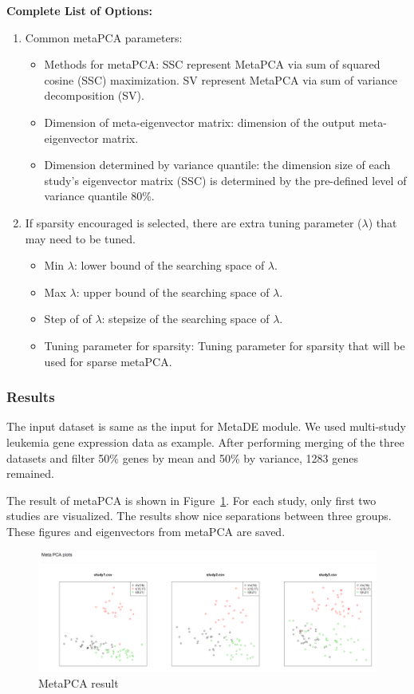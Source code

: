 \textbf{Complete List of Options:} 
\begin{enumerate}
\item Common metaPCA parameters: 

\begin{itemize}
\item Methods for metaPCA:
SSC represent MetaPCA via sum of squared cosine (SSC) maximization.
SV represent MetaPCA via sum of variance decomposition (SV).
\item Dimension of meta-eigenvector matrix: dimension of the output meta-eigenvector matrix.
\item Dimension determined by variance quantile:
the dimension size of each study's eigenvector matrix (SSC) is determined  by the pre-defined level of variance quantile 80\%.
\end{itemize}

\item If sparsity encouraged is selected, there are extra tuning parameter ($\lambda$) that may need to be tuned.

\begin{itemize}
\item  Min $\lambda$: lower bound of the searching space of $\lambda$.
\item Max $\lambda$: upper bound of the searching space of $\lambda$.
\item Step of of $\lambda$: stepsize of the searching space of $\lambda$.
\item Tuning parameter for sparsity: Tuning parameter for sparsity that will be used for sparse metaPCA.
\end{itemize}


\end{enumerate}


\subsubsection{Results}
The input dataset is same as the input for MetaDE module.
We used multi-study leukemia gene expression data as example.
After performing merging of the three datasets and filter 50\% genes by mean and 50\% by variance, 1283 genes remained.

The result of metaPCA is shown in Figure~\ref{fig:metaPCAresult}.
For each study, only first two studies are visualized.
The results show nice separations between three groups.
These figures and eigenvectors from metaPCA are saved.

\begin{figure}[H]
\begin{center}
\includegraphics[scale=0.3]{./figure/metaPCA/metaPCA}
\caption{MetaPCA result}
\label{fig:metaPCAresult}
\end{center}
\end{figure}

